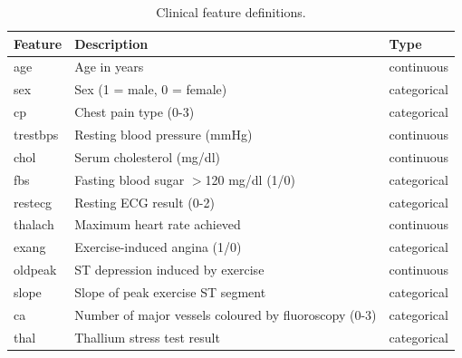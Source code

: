 \begin{table}[t]
\centering
\caption{Clinical feature definitions.}
\label{tab:featdesc}
\small
\begin{tabular}{lp{5.2cm}l}
\toprule
Feature & Description & Type \\
\midrule
age & Age in years & continuous \\
sex & Sex (1 = male, 0 = female) & categorical \\
cp & Chest pain type (0-3) & categorical \\
trestbps & Resting blood pressure (mmHg) & continuous \\
chol & Serum cholesterol (mg/dl) & continuous \\
fbs & Fasting blood sugar $>$120 mg/dl (1/0) & categorical \\
restecg & Resting ECG result (0-2) & categorical \\
thalach & Maximum heart rate achieved & continuous \\
exang & Exercise-induced angina (1/0) & categorical \\
oldpeak & ST depression induced by exercise & continuous \\
slope & Slope of peak exercise ST segment & categorical \\
ca & Number of major vessels coloured by fluoroscopy (0-3) & categorical \\
thal & Thallium stress test result & categorical \\
\bottomrule
\end{tabular}
\end{table}

